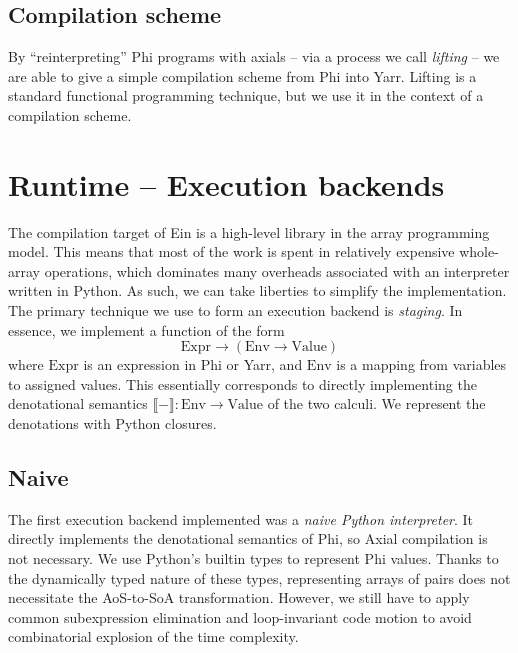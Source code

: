 \subsection{Compilation scheme}

By ``reinterpreting'' Phi programs with axials -- via a process we call \textit{lifting} -- we are able to give a simple compilation scheme from Phi into Yarr. Lifting is a standard functional programming technique, but we use it in the context of a compilation scheme. 

\todothis


\section{Runtime -- Execution backends}
\label{execution-backend}

The compilation target of Ein is a high-level library in the array programming model. This means that most of the work is spent in relatively expensive whole-array operations, which dominates many overheads associated with an interpreter written in Python. As such, we can take liberties to simplify the implementation. The primary technique we use to form an execution backend is \textit{staging}. In essence, we implement a function of the form
$$ \mathrm{Expr} \to \left( \mathrm{Env} \to \mathrm{Value} \right) $$
where $\mathrm{Expr}$ is an expression in Phi or Yarr, and $\mathrm{Env}$ is a mapping from variables to assigned values. This essentially corresponds to directly implementing the denotational semantics $\llbracket - \rrbracket : \mathrm{Env} \to \mathrm{Value}$ of the two calculi. We represent the denotations with Python closures.

\subsection{Naive}

The first execution backend implemented was a \textit{naive Python interpreter}. It directly implements the denotational semantics of Phi, so Axial compilation is not necessary. We use Python's builtin types to represent Phi values. Thanks to the dynamically typed nature of these types, representing arrays of pairs does not necessitate the AoS-to-SoA transformation. However, we still have to apply common subexpression elimination and loop-invariant code motion to avoid combinatorial explosion of the time complexity.

